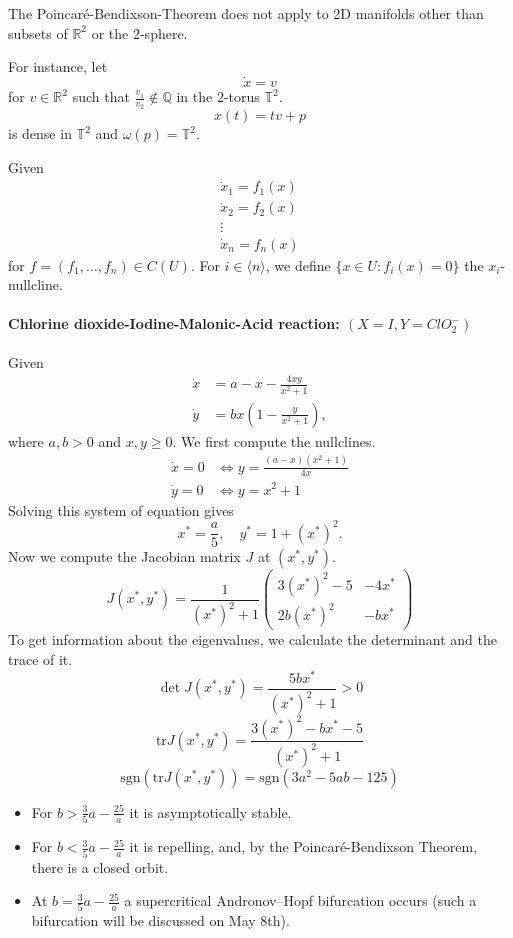 \documentclass{article}
\newcommand*{\Q}{\mathbb{Q}}
\newcommand*{\R}{\mathbb{R}}
\newcommand*{\jbr}[1]{{\langle #1 \rangle}}
\newcommand*{\reci}[1]{{\frac{1}{#1}}}
\newcommand*{\tr}{\text{tr}}
\newcommand*{\sgn}{\text{sgn}}
\newcommand*{\mattwo}[4]{\begin{pmatrix}
    #1&#2\\#3&#4
\end{pmatrix}}
\begin{document}
\begin{rem}
    The Poincar\'e-Bendixson-Theorem does not apply to 2D manifolds other than subsets of $\R^2$ or the $2$-sphere.
\end{rem}

For instance, let
$$\dot x = v$$
for $v \in \R^2$ such that $\frac{v_1}{v_2}\notin \Q$ in the $2$-torus $\mathbb{T}^2$.
$$x(t)=tv+p$$
is dense in $\mathbb{T}^2$ and $\omega(p) = \mathbb{T}^2$.

\begin{defin}
    Given
    $$\begin{aligned}
        \dot x_1 = f_1(x)\\
        \dot x_2 = f_2(x)\\
        \vdots\\
        \dot x_n = f_n(x)
    \end{aligned}$$
    for $f = (f_1, \dots, f_n) \in C(U)$. For $i \in \jbr{n}$, we define $\{x \in U: f_i(x) = 0\}$ the $x_i$-nullcline.
\end{defin}

\paragraph{Chlorine dioxide-Iodine-Malonic-Acid reaction: $(X = I, Y = ClO_2^-)$}
Given
$$\begin{aligned} \dot x &= a-x-\frac{4xy}{x^2+1}\\
\dot y &= bx\left(1-\frac{y}{x^2+1}\right),\end{aligned}$$
where $a,b > 0$ and $x,y\geq 0$. We first compute the nullclines.
$$\begin{aligned}\dot x = 0 &\Leftrightarrow y = \frac{(a-x)(x^2+1)}{4x}\\
\dot y = 0 &\Leftrightarrow y = x^2+1\end{aligned}$$
Solving this system of equation gives
$$x^* = \frac a5,\quad y^* = 1+(x^*)^2.$$
Now we compute the Jacobian matrix $J$ at $(x^*,y^*)$.
$$J (x^*,y^*) = \reci{(x^*)^2+1}\mattwo{3(x^*)^2-5}{-4x^*}{2b(x^*)^2}{-bx^*}$$
To get information about the eigenvalues, we calculate the determinant and the trace of it.
$$\det J(x^*,y^*)=\frac{5bx^*}{(x^*)^2+1}>0$$
$$\tr J(x^*,y^*)=\frac{3(x^*)^2-bx^*-5}{(x^*)^2+1}$$
$$\sgn(\tr J(x^*,y^*)) = \sgn(3a^2-5ab-125)$$
\begin{itemize}
    \item For $b > \frac35a-\frac{25}a$ it is asymptotically stable.

    \item For $b < \frac35a-\frac{25}a$ it is repelling, and, by the Poincar\'e-Bendixson Theorem, there is a closed orbit.

    \item At $b = \frac35a-\frac{25}a$ a supercritical Andronov--Hopf bifurcation occurs (such a bifurcation will be discussed on May 8th).
\end{itemize}
\end{document}
